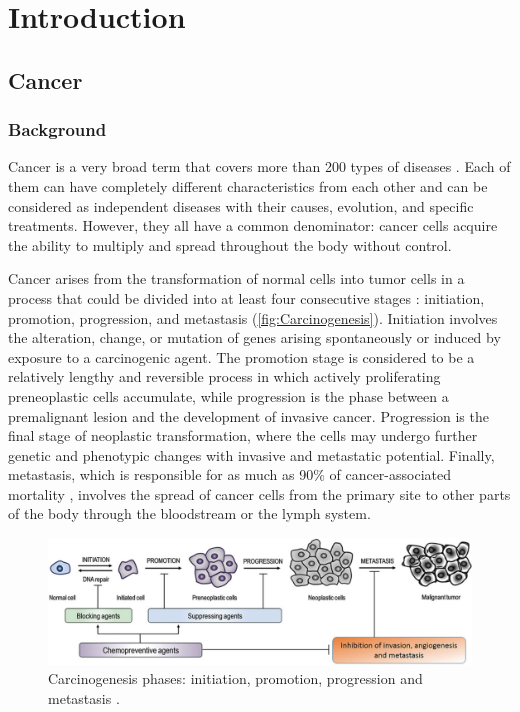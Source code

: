 \chapter{Introduction}

\section{Cancer}

\subsection{Background}

Cancer is a very broad term that covers more than 200 types of diseases \cite{WCR}. Each of them can have completely different characteristics from each other and can be considered as independent diseases with their causes, evolution, and specific treatments. However, they all have a common denominator: cancer cells acquire the ability to multiply and spread throughout the body without control.

Cancer arises from the transformation of normal cells into tumor cells in a process that could be divided into at least four consecutive stages \cite{Stages}: initiation, promotion, progression, and metastasis (\autoref{fig:Carcinogenesis}). Initiation involves the alteration, change, or mutation of genes arising spontaneously or induced by exposure to a carcinogenic agent. The promotion stage is considered to be a relatively lengthy and reversible process in which actively proliferating preneoplastic cells accumulate, while progression is the phase between a premalignant lesion and the development of invasive cancer. Progression is the final stage of neoplastic transformation, where the cells may undergo further genetic and phenotypic changes with invasive and metastatic potential. Finally, metastasis, which is responsible for as much as 90\% of cancer-associated mortality \cite{Metastasis}, involves the spread of cancer cells from the primary site to other parts of the body through the bloodstream or the lymph system.

\begin{figure}[t]
    \centering
    \includegraphics[width=\textwidth]{Images/chapter_1/carcinogenesis.png}
    \caption{Carcinogenesis phases: initiation, promotion, progression and metastasis \cite{Stages}.}
    \label{fig:Carcinogenesis}
\end{figure}

